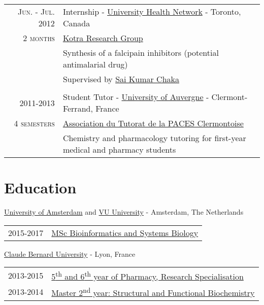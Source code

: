 \documentclass[a4paper, 10pt]{article} %
\begin{document}
\begin{tabular}{r|p{12.5cm}}

\textsc{Jun. - Jul. 2012} & Internship - \href{http://www.uhn.ca/}{University Health Network} - Toronto, Canada \\
\textsc{2 months} & \href{http://kotralab.uhnresearch.ca/}{Kotra Research Group} \\
& \footnotesize{Synthesis of a falcipain inhibitors (potential antimalarial drug)} \\
& \footnotesize{Supervised by \href{http://www.linkedin.com/in/sai-kumar-chakka-178aa215}{Sai Kumar Chaka}} \\
\multicolumn{2}{c}{} \\


\textsc{2011-2013} & Student Tutor - \href{http://www.u-clermont1.fr/}{University of Auvergne} - Clermont-Ferrand, France \\
\textsc{4 semesters} & \href{https://www.atpclermont.fr/}{Association du Tutorat de la PACES Clermontoise}\\
& \footnotesize{Chemistry and pharmacology tutoring for first-year medical and pharmacy students} \\

\end{tabular}


\section{Education}

\href{http://www.uva.nl/en/home}{University of Amsterdam} and \href{http://www.vu.nl/en/index.aspx}{VU University} - Amsterdam, The Netherlands

\begin{tabular}{ll}
\textsc{2015-2017} & \href{http://gss.uva.nl/future-msc-students/life-and-earth-sciences/content33/systems-biology.html}{MSc Bioinformatics and Systems Biology}
\end{tabular}

\href{http://www.univ-lyon1.fr/en/home-759942.kjsp?RH=WWW-FR}{Claude Bernard University} - Lyon, France

\begin{tabular}{ll}
\textsc{2013-2015} & \href{http://ispb.univ-lyon1.fr/}{5\textsuperscript{th} and 6\textsuperscript{th} year of Pharmacy, Research Specialisation} \\
\textsc{2013-2014} & \href{http://spiralconnect.univ-lyon1.fr/webapp/website/website.html?id=2218791&read=true}{Master 2\textsuperscript{nd} year: Structural and Functional Biochemistry}
\end{tabular}
\end{document}
